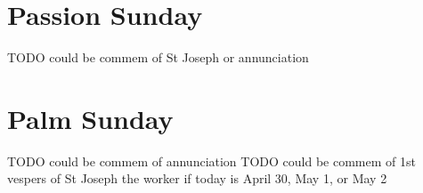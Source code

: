 {{
\section{Passion Sunday}
\subtitle{1st Class}
\def\printfullhymn{
	\label{hymn-vexillaregis}
	TODO fix all caps alignment
	{
	
	\printhymn{\oldstylenums{\hymnlinetwo}}{\hymninitial}{\hymntex}{\hymntranslation}

	{
		\def\vrlinebreak{T}
		\label{vr-eripeme}
		\printvr[\greblockcustos]{\vrtex}{\vtranslation}{\rtranslation}
	}
	}
}
}
{
TODO could be commem of St Joseph or annunciation
\bigskip
\benedicamusdomino{}
}

{
\section{Palm Sunday}
\subtitle{1st Class}
\renewcommand{\printhymnnote}{
	\noindent\printnote{Hymn. \emph{Vexílla Regis}, page \pageref{hymn-vexillaregis}.
	\Vbar~\emph{Eripe me, Dómine}, page \pageref{vr-eripeme}.}
}
}
{
TODO could be commem of annunciation
TODO could be commem of 1st vespers of St Joseph the worker if today is April 30, May 1, or May 2
\bigskip
\benedicamusdomino{}
}

}